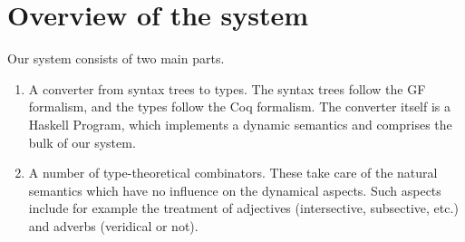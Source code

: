\documentclass[11pt]{article}
\begin{document}
\section{Overview of the system}

Our system consists of two main parts.
\begin{enumerate}
\item A converter from syntax trees to types. The syntax trees follow
  the GF formalism, and the types follow the Coq formalism. The
  converter itself is a Haskell Program, which implements a dynamic
  semantics and comprises the bulk of our system.
\item A number of type-theoretical combinators. These take care of the
  natural semantics which have no influence on the dynamical
  aspects. Such aspects include for example the treatment of adjectives
  (intersective, subsective, etc.) and adverbs (veridical or not).
\end{enumerate}





\end{document}
